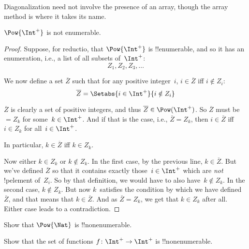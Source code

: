 \documentclass[../../include/open-logic-section]{subfiles}
\begin{document}
Diagonalization need not involve the presence of an array, though the
array method is where it takes its name.

\begin{thm}
$\Pow{\Int^+}$ is not enumerable.
\end{thm}

\begin{proof}
Suppose, for reductio, that $\Pow{\Int^+}$ is !!{enumerable}, and so
it has an enumeration, i.e., a list of all subsets of~$\Int^+$:
\[
Z_{1}, Z_{2}, Z_{3}, \dots
\]

We now define a set $\overline{Z}$ such that for any positive
integer~$i$, $i \in \overline{Z}$ iff $i \notin Z_{i}$:
\[
\overline{Z} = \Setabs{i \in \Int^+}{i \notin Z_i}
\]

$\overline{Z}$ is clearly a set of positive integers, and thus $\overline{Z}
\in \Pow(\Int^+)$. So $\overline{Z}$ must be $= Z_k$ for some~$k \in
\Int^+$.  And if that is the case, i.e., $\overline{Z} = Z_k$, then $i
\in \overline{Z}$ iff $i \in Z_k$ for all~$i \in \Int^+$.

In particular, $k \in \overline{Z}$ iff $k \in Z_k$.

Now either $k \in Z_{k}$ or $k \notin Z_{k}$. In the first case, by
the previous line, $k \in \overline{Z}$. But we've defined
$\overline{Z}$ so that it contains exactly those~$i \in \Int^+$ which
are \emph{not} !p{element} of~$Z_i$. So by that definition, we would
have to also have~$k \notin Z_k$.  In the second case, $k \notin Z_k$.
But now $k$~satisfies the condition by which we have
defined~$\overline{Z}$, and that means that $k \in \overline{Z}$.  And
as $\overline{Z} = Z_k$, we get that $k \in Z_k$ after all.  Either
case leads to a contradiction.
\end{proof}

\begin{prob}
Show that $\Pow{\Nat}$ is !!{nonenumerable}.
\end{prob}

\begin{prob}
Show that the set of functions $f \colon \Int^+ \to \Int^+$ is
!!{nonenumerable}.
\end{prob}
\end{document}
